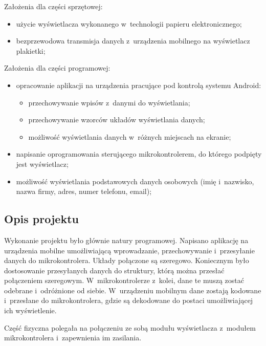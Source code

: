 \documentclass[a4paper,12pt, twoside]{article}
\begin{document}
    	\begin{flushleft} Założenia dla części sprzętowej:
    	\begin{itemize}
    		\item użycie wyświetlacza wykonanego w~technologii papieru elektronicznego;
    		\item bezprzewodowa transmisja danych z~urządzenia mobilnego na wyświetlacz plakietki;
    	\end{itemize}
    	
    	\vspace{.5cm}
    	Założenia dla części programowej:
    	\begin{itemize}
    		\item opracowanie aplikacji na urządzenia pracujące pod kontrolą systemu Android:
    		\begin{itemize}
    		    \item przechowywanie wpisów z~danymi do wyświetlania;
    		    \item przechowywanie wzorców układów wyświetlania danych;
    		    \item możliwość wyświetlania danych w~różnych miejscach na ekranie;
    		\end{itemize}
    		\item napisanie oprogramowania sterującego mikrokontrolerem, do którego podpięty jest wyświetlacz;
    		\item możliwość wyświetlania podstawowych danych osobowych (imię i~nazwisko, nazwa firmy, adres, numer telefonu, email);
    	\end{itemize}
    	\end{flushleft}
    	
    	\subsection{Opis projektu}
    	Wykonanie projektu było głównie natury programowej. Napisano aplikację na urządzenia mobilne umożliwiającą wprowadzanie, przechowywanie i~przesyłanie danych do mikrokontrolera. Układy połączone są szeregowo. Koniecznym było dostosowanie przesyłanych danych do struktury, którą można przesłać połączeniem szeregowym. W~mikrokontrolerze z~kolei, dane te muszą zostać odebrane i~odróżnione od siebie. W~urządzeniu mobilnym dane zostają kodowane i~przesłane do mikrokontrolera, gdzie są dekodowane do postaci umożliwiającej ich wyświetlenie.
    	
    	Część fizyczna polegała na połączeniu ze sobą modułu wyświetlacza z~modułem mikrokontrolera i~zapewnienia im zasilania. 
	
\end{document}
